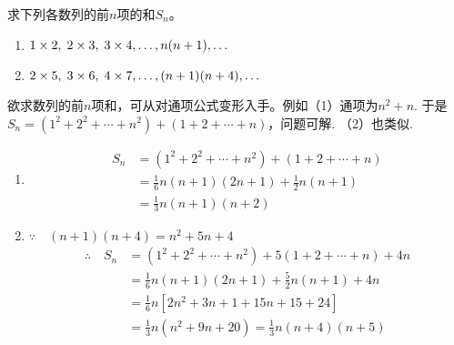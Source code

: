 \begin{example}
求下列各数列的前$n$项的和$S_n$。
\begin{enumerate}[(1)]
    \item $1\times2,\; 2\times3,\; 3\times4,\ldots,n(n+1),\ldots$
\item $2\times5,\; 3\times6,\; 4\times7,\ldots,(n+1)(n+4),\ldots$
\end{enumerate}
\end{example}

\begin{analyze}
    欲求数列的前$n$项和，可从对通项公式变形入手。例如（1）通项为$n^2+n$. 于是$S_n=(1^2+2^2+\cdots +n^2)+(1+2+\cdots+n)$，问题可解. （2）也类似.    
\end{analyze}

\begin{solution}
\begin{enumerate}[(1)]
    \item \[\begin{split}
S_n&=(1^2+2^2+\cdots+n^2)+(1+2+\cdots +n)\\
&=\frac{1}{6}n(n+1)(2n+1)+\frac{1}{2}n(n+1)\\
&=\frac{1}{3}n(n+1)(n+2)
    \end{split}\]
    \item $\because\quad (n+1)(n+4)=n^2+5n+4$
    \[\begin{split}
\therefore\quad S_n&=(1^2+2^2+\cdots+n^2)+5(1+2+\cdots +n)+4n\\
&=\frac{1}{6}n(n+1)(2n+1)+\frac{5}{2}n(n+1)+4n\\
&=\frac{1}{6}n[2n^2+3n+1+15n+15+24]\\
&=\frac{1}{3}n(n^2+9n+20)=\frac{1}{3}n(n+4)(n+5)
    \end{split}\]
\end{enumerate}
\end{solution}

